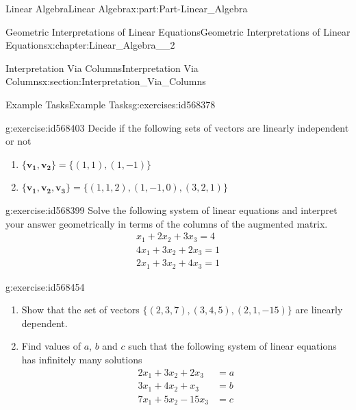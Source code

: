 \documentclass[oneside,10pt,]{book}
\numberwithin{equation}{section}
\newcommand{\amp}{&}
\begin{document}
\begin{partptx}{Linear Algebra}{}{Linear Algebra}{}{}{x:part:Part-Linear_Algebra}
\begin{chapterptx}{Geometric Interpretations of Linear Equations}{}{Geometric Interpretations of Linear Equations}{}{}{x:chapter:Linear_Algebra__2}
\begin{sectionptx}{Interpretation Via Columns}{}{Interpretation Via Columns}{}{}{x:section:Interpretation_Via_Columns}
%
%
\typeout{************************************************}
\typeout{************************************************}
%
\begin{exercises-subsection-numberless}{Example Tasks}{}{Example Tasks}{}{}{g:exercises:id568378}
\begin{divisionexercise}{1}{}{}{g:exercise:id568403}%
Decide if the following sets of vectors are linearly independent or not%
\begin{enumerate}[label=(\alph*).]
\item{}\(\displaystyle \{\mathbf{v_1, v_2}\}=\Big\{(1,1), (1,-1)\Big\}\)%
\item{}\(\displaystyle \{\mathbf{v_1, v_2, v_3}\}=\Big\{(1,1, 2), (1,-1,0), (3,2,1)\Big\}\)%
\end{enumerate}
%
\end{divisionexercise}%
\begin{divisionexercise}{2}{}{}{g:exercise:id568399}%
Solve the following system of linear equations and interpret your answer geometrically in terms of the columns of the augmented matrix.%
\begin{gather*}
x_1+2x_2+3x_3=4\\
4x_1+3x_2+2x_3=1\\
2x_1+3x_2+4x_3=1
\end{gather*}
%
\end{divisionexercise}%
\begin{divisionexercise}{3}{}{}{g:exercise:id568454}%
%
\begin{enumerate}[label=(\alph*).]
\item{}Show that the set of vectors \(\Big\{(2,3, 7), (3,4, 5), (2,1,-15) \Big\}\) are linearly dependent.%
\item{}Find values of \(a\), \(b\) and \(c\) such that the following system of linear equations has infinitely many solutions%
\begin{align*}
2x_1+3x_2+2x_3 \amp =a\\
3x_1+4x_2+x_3 \amp =b\\
7x_1+5x_2-15x_3 \amp =c
\end{align*}
%
\end{enumerate}
%
\end{divisionexercise}%
\end{exercises-subsection-numberless}
\end{sectionptx}
\end{chapterptx}
%
\typeout{************************************************}

\end{partptx}
\end{document}
